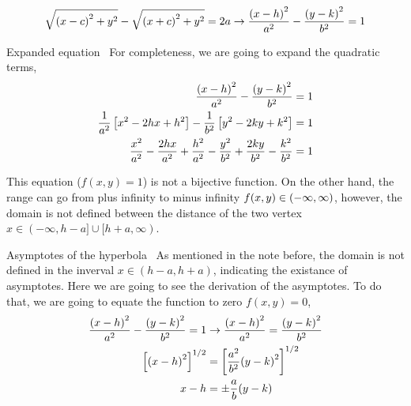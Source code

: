 \documentclass[../main-notes.tex]{subfile}
\begin{document}
\begin{gather*}
    \sqrt{\qty(x-c)^2+y^2} - \sqrt{\qty(x+c)^2+y^2} = 2a\to\frac{\qty(x-h)^2}{a^2} - \frac{\qty(y-k)^2}{b^2} = 1
\end{gather*}

\begin{note}{Expanded equation}{~}
    For completeness, we are going to expand the quadratic terms,
    \begin{align*}
        \frac{\qty(x-h)^2}{a^2} - \frac{\qty(y-k)^2}{b^2} &= 1 \\
        \frac{1}{a^2}\left[x^2-2hx+h^2\right] -\frac{1}{b^2}\left[y^2-2ky+k^2\right] &= 1 \\
        \frac{x^2}{a^2}-\frac{2hx}{a^2}+\frac{h^2}{a^2}  -\frac{y^2}{b^2}+\frac{2ky}{b^2}-\frac{k^2}{b^2} &= 1
    \end{align*}

    This equation ($f(x,y)=1$) is not a bijective function.
    On the other hand, the range can go from plus infinity to minus infinity $f(x,y)\in\qty(-\infty,\infty)$, however, the domain is not defined between the distance of the two vertex $x\in(-\infty,h-a]\cup[h+a,\infty)$.
\end{note}

\begin{note}{Asymptotes of the hyperbola}{~}
    As mentioned in the note before, the domain is not defined in the inverval $x\in(h-a,h+a)$, indicating the existance of asymptotes.
    Here we are going to see the derivation of the asymptotes.
    To do that, we are going to equate the function to zero $f(x,y)=0$,
    \begin{align*}
        \frac{\qty(x-h)^2}{a^2} - \frac{\qty(y-k)^2}{b^2} = 1 &\to\frac{\qty(x-h)^2}{a^2} = \frac{\qty(y-k)^2}{b^2} \\
        \left[\qty(x-h)^2\right]^{1/2} &= \left[\frac{a^2}{b^2}\qty(y-k)^2\right]^{1/2} \\
        x-h &= \pm\frac{a}{b}\qty(y-k) 
    \end{align*}
\end{note}


\end{document}
